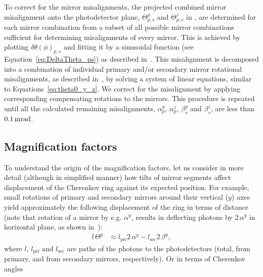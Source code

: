 To correct for the mirror misalignments, the projected combined mirror
misalignment onto the photodetector plane, $\varTheta^y_{p,s}$ and
$\varTheta^z_{p,s}$ in , are determined for
each mirror combination from a subset of all possible mirror combinations
sufficient for determining misalignments of every mirror. This is achieved by
plotting $\delta\theta(\phi)_{p,s}$ and fitting it by a sinusoidal function (see
Equation~\ref{eq:DeltaTheta_ps}) as described in~. This
misalignment is decomposed into a combination of individual primary and/or
secondary mirror rotational misalignments, as described
in~, by solving a system of linear equations,
similar to Equations~\ref{eq:theta0_y_z}. We correct for the misalignment by
applying corresponding compensating rotations to the mirrors. This procedure is
repeated until all the calculated remaining misalignments, $\alpha^y_p$,
$\alpha^z_p$, $\beta^y_s$ and $\beta^z_s$, are less than $0.1\rm \,mrad$.


\subsection{Magnification factors}
\label{subsec:Magnification}

To understand the origin of the magnification factors, let us consider in more
detail (although in simplified manner) how tilts of mirror segments affect
displacement of the Cherenkov ring against its expected position. For example,
small rotations of primary and secondary mirrors around their vertical ($y$)
axes yield approximately the following displacement of the ring in terms of
distance (note that rotation of a mirror by e.g. $\alpha^y$, results in
deflecting photons by $2\,\alpha^y$ in horizontal plane, as shown
in~):
\begin{align*}
l\,\varTheta^y & \approx l_{\mathrm{pri}}2\,\alpha^y
                       - l_{\mathrm{sec}}2\, \beta^y,
\end{align*}
where $l$, $l_{\mathrm{pri}}$ and $l_{\mathrm{sec}}$ are paths of the photons to
the photodetectors (total, from primary, and from secondary mirrors,
respectively). Or in terms of Cherenkov angles

